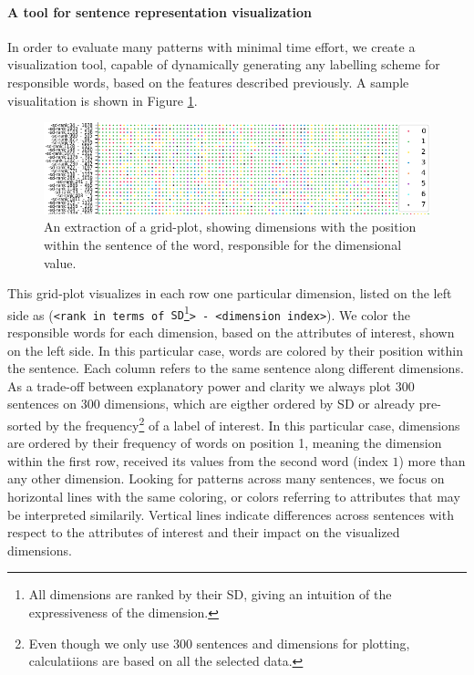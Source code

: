 \paragraph*{A tool for sentence representation visualization}
In order to evaluate many patterns with minimal time effort, we create a visualization tool, capable of dynamically generating any labelling scheme for responsible words, based on the features described previously. A sample visualitation is shown in Figure \ref{fig:find_position_1}.
\begin{figure}[tph!]
\centering
	\includegraphics[totalheight=4cm]{fig/finpone.png}
	\caption{An extraction of a grid-plot, showing dimensions with the position within the sentence of the word, responsible for the dimensional value.}
	\label{fig:find_position_1}
\end{figure}
This grid-plot visualizes in each row one particular dimension, listed on the left side as (\texttt{<rank in terms of \ac{SD}}\footnote{All dimensions are ranked by their \ac{SD}, giving an intuition of the expressiveness of the dimension.}\texttt{> - <dimension index>}). We color the responsible words for each dimension, based on the attributes of interest, shown on the left side. In this particular case, words are colored by their position within the sentence.  Each column refers to the same sentence along different dimensions. As a trade-off between explanatory power and clarity we always plot 300 sentences on 300 dimensions, which are eigther ordered by \ac{SD} or already pre-sorted by the frequency\footnote{Even though we only use 300 sentences and dimensions for plotting, calculatiions are based on all the selected data.} of a label of interest. In this particular case, dimensions are ordered by their frequency of words on position 1, meaning the dimension within the first row, received its values from the second word (index $1$) more than any other dimension. Looking for patterns across many sentences, we focus on horizontal lines with the same coloring, or colors referring to attributes that may be interpreted similarily. Vertical lines indicate differences across sentences with respect to the attributes of interest and their impact on the visualized dimensions.


